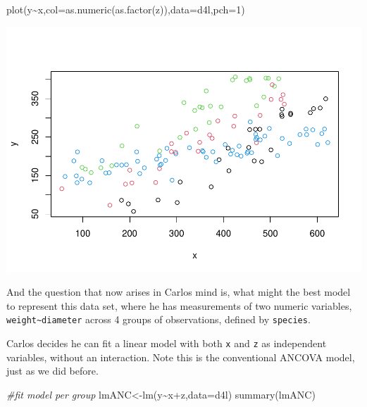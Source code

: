 \documentclass[
]{book}
\newenvironment{Shaded}{\begin{snugshade}}{\end{snugshade}}
\newcommand{\AttributeTok}[1]{\textcolor[rgb]{0.77,0.63,0.00}{#1}}
\newcommand{\CommentTok}[1]{\textcolor[rgb]{0.56,0.35,0.01}{\textit{#1}}}
\newcommand{\DecValTok}[1]{\textcolor[rgb]{0.00,0.00,0.81}{#1}}
\newcommand{\FunctionTok}[1]{\textcolor[rgb]{0.00,0.00,0.00}{#1}}
\newcommand{\NormalTok}[1]{#1}
\newcommand{\OtherTok}[1]{\textcolor[rgb]{0.56,0.35,0.01}{#1}}
\newcommand{\SpecialCharTok}[1]{\textcolor[rgb]{0.00,0.00,0.00}{#1}}
\begin{document}
\begin{Shaded}
\begin{Highlighting}[]
\FunctionTok{plot}\NormalTok{(y}\SpecialCharTok{\textasciitilde{}}\NormalTok{x,}\AttributeTok{col=}\FunctionTok{as.numeric}\NormalTok{(}\FunctionTok{as.factor}\NormalTok{(z)),}\AttributeTok{data=}\NormalTok{d4l,}\AttributeTok{pch=}\DecValTok{1}\NormalTok{)}
\end{Highlighting}
\end{Shaded}

\includegraphics{ECOMODbook_files/figure-latex/a11.20-1.pdf}

And the question that now arises in Carlos mind is, what might the best model to represent this data set, where he has measurements of two numeric variables, \texttt{weight\textasciitilde{}diameter} across 4 groups of observations, defined by \texttt{species}.

Carlos decides he can fit a linear model with both \texttt{x} and \texttt{z} as independent variables, without an interaction. Note this is the conventional ANCOVA model, just as we did before.

\begin{Shaded}
\begin{Highlighting}[]
\CommentTok{\#fit model per group}
\NormalTok{lmANC}\OtherTok{\textless{}{-}}\FunctionTok{lm}\NormalTok{(y}\SpecialCharTok{\textasciitilde{}}\NormalTok{x}\SpecialCharTok{+}\NormalTok{z,}\AttributeTok{data=}\NormalTok{d4l)}
\FunctionTok{summary}\NormalTok{(lmANC)}
\end{Highlighting}
\end{Shaded}
\end{document}
